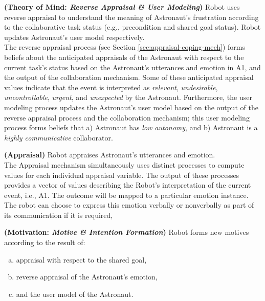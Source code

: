 \noindent\item \textbf{(Theory of Mind: \textit{Reverse Appraisal \& User
Modeling})} Robot uses reverse appraisal to understand the meaning of
Astronaut's frustration according to the collaborative task status (e.g.,
precondition and shared goal status). Robot updates Astronaut's user model
respectively.\\

The reverse appraisal process (see Section \ref{sec:appraisal-coping-mech})
forms beliefs about the anticipated appraisals of the Astronaut with respect to
the current task's status based on the Astronaut's utterances and emotion in A1,
and the output of the collaboration mechanism. Some of these anticipated
appraisal values indicate that the event is interpreted as \textit{relevant},
\textit{undesirable}, \textit{uncontrollable}, \textit{urgent}, and
\textit{unexpected} by the Astronaut. Furthermore, the user modeling process
updates the Astronaut's user model based on the output of the reverse appraisal
process and the collaboration mechanism; this user modeling process forms
beliefs that a) Astronaut has \textit{low autonomy}, and b) Astronaut is a
\textit{highly communicative} collaborator.\\

\noindent\item \textbf{(Appraisal)} Robot appraises Astronaut's utterances and
emotion.\\

The Appraisal mechanism simultaneously uses distinct processes to compute values
for each individual appraisal variable. The output of these processes provides a
vector of values describing the Robot's interpretation of the current event,
i.e., A1. The outcome will be mapped to a particular emotion instance. The robot
can choose to express this emotion verbally or nonverbally as part of its
communication if it is required,\\

\noindent\item \textbf{(Motivation: \textit{Motive \& Intention Formation})}
Robot forms new motives according to the result of:

\begin{enumerate}[a)]
  \item appraisal with respect to the shared goal,
  \item reverse appraisal of the Astronaut's emotion,
  \item and the user model of the Astronaut. 
\end{enumerate}

